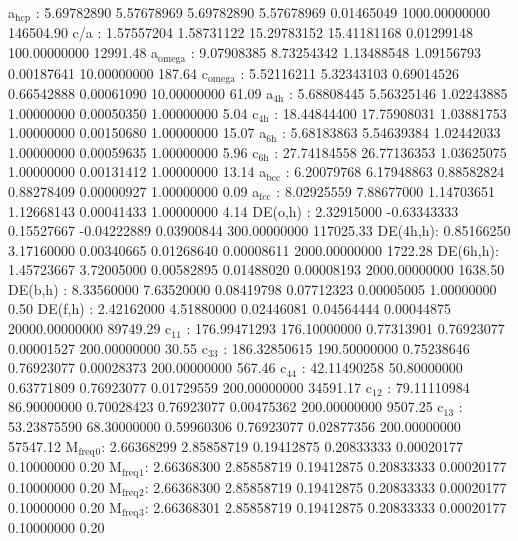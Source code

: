 \documentclass[11pt]{article}
\begin{document}
a\(_{\text{hcp}}\)   :   5.69782890   5.57678969   5.69782890   5.57678969   0.01465049 1000.00000000    146504.90
c/a     :   1.57557204   1.58731122  15.29783152  15.41181168   0.01299148 100.00000000     12991.48
a\(_{\text{omega}}\) :   9.07908385   8.73254342   1.13488548   1.09156793   0.00187641  10.00000000       187.64
c\(_{\text{omega}}\) :   5.52116211   5.32343103   0.69014526   0.66542888   0.00061090  10.00000000        61.09
a\(_{\text{4h}}\)    :   5.68808445   5.56325146   1.02243885   1.00000000   0.00050350   1.00000000         5.04
c\(_{\text{4h}}\)    :  18.44844400  17.75908031   1.03881753   1.00000000   0.00150680   1.00000000        15.07
a\(_{\text{6h}}\)    :   5.68183863   5.54639384   1.02442033   1.00000000   0.00059635   1.00000000         5.96
c\(_{\text{6h}}\)    :  27.74184558  26.77136353   1.03625075   1.00000000   0.00131412   1.00000000        13.14
a\(_{\text{bcc}}\)   :   6.20079768   6.17948863   0.88582824   0.88278409   0.00000927   1.00000000         0.09
a\(_{\text{fcc}}\)   :   8.02925559   7.88677000   1.14703651   1.12668143   0.00041433   1.00000000         4.14
DE(o,h) :   2.32915000  -0.63343333   0.15527667  -0.04222889   0.03900844 300.00000000    117025.33
DE(4h,h):   0.85166250   3.17160000   0.00340665   0.01268640   0.00008611 2000.00000000      1722.28
DE(6h,h):   1.45723667   3.72005000   0.00582895   0.01488020   0.00008193 2000.00000000      1638.50
DE(b,h) :   8.33560000   7.63520000   0.08419798   0.07712323   0.00005005   1.00000000         0.50
DE(f,h) :   2.42162000   4.51880000   0.02446081   0.04564444   0.00044875 20000.00000000     89749.29
c\(_{\text{11}}\)    : 176.99471293 176.10000000   0.77313901   0.76923077   0.00001527 200.00000000        30.55
c\(_{\text{33}}\)    : 186.32850615 190.50000000   0.75238646   0.76923077   0.00028373 200.00000000       567.46
c\(_{\text{44}}\)    :  42.11490258  50.80000000   0.63771809   0.76923077   0.01729559 200.00000000     34591.17
c\(_{\text{12}}\)    :  79.11110984  86.90000000   0.70028423   0.76923077   0.00475362 200.00000000      9507.25
c\(_{\text{13}}\)    :  53.23875590  68.30000000   0.59960306   0.76923077   0.02877356 200.00000000     57547.12
M\(_{\text{freq}}\)\(_{\text{0}}\):   2.66368299   2.85858719   0.19412875   0.20833333   0.00020177   0.10000000         0.20
M\(_{\text{freq}}\)\(_{\text{1}}\):   2.66368300   2.85858719   0.19412875   0.20833333   0.00020177   0.10000000         0.20
M\(_{\text{freq}}\)\(_{\text{2}}\):   2.66368300   2.85858719   0.19412875   0.20833333   0.00020177   0.10000000         0.20
M\(_{\text{freq}}\)\(_{\text{3}}\):   2.66368301   2.85858719   0.19412875   0.20833333   0.00020177   0.10000000         0.20
\end{document}

